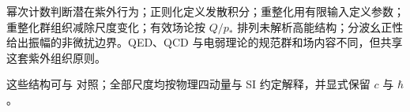 幂次计数判断潜在紫外行为；正则化定义发散积分；重整化用有限输入定义参数；重整化群组织减除尺度变化；有效场论按 \(Q/p_*\) 排列未解析高能结构；分波幺正性给出振幅的非微扰边界。QED、QCD 与电弱理论的规范群和场内容不同，但共享这套紫外组织原则。


这些结构可与 \cite{PeskinSchroeder1995,Schwartz2014QFT} 对照；全部尺度均按物理四动量与 SI 约定解释，并显式保留 \(c\) 与 \(\hbar\)。
